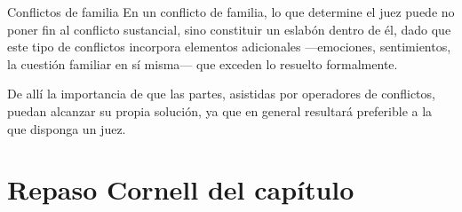 \documentclass[12pt,oneside]{book}
\begin{document}
\begin{example}{Conflictos de familia}
En un conflicto de familia, lo que determine el juez puede no poner fin al conflicto sustancial, sino constituir un eslabón dentro de él, dado que este tipo de conflictos incorpora elementos adicionales ---emociones, sentimientos, la cuestión familiar en sí misma--- que exceden lo resuelto formalmente.
\end{example}

De allí la importancia de que las partes, asistidas por operadores de conflictos, puedan alcanzar su propia solución, ya que en general resultará preferible a la que disponga un juez.

\section*{Repaso Cornell del capítulo}
\end{document}
